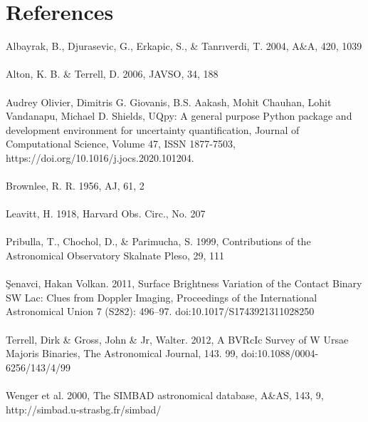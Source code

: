 \section{References}
\label{sec:ref}

Albayrak, B., Djurasevic, G., Erkapic, S., \& Tanrıverdi, T. 2004, A\&A, 420, 1039\\ \\
Alton, K. B. \& Terrell, D. 2006, JAVSO, 34, 188\\ \\ 
Audrey Olivier, Dimitris G. Giovanis, B.S. Aakash, Mohit Chauhan, Lohit Vandanapu, Michael D. Shields, UQpy: A general purpose Python package and development environment for uncertainty quantification, Journal of Computational Science, Volume 47, ISSN 1877-7503, https://doi.org/10.1016/j.jocs.2020.101204.\\ \\
Brownlee, R. R. 1956, AJ, 61, 2\\ \\
Leavitt, H. 1918, Harvard Obs. Circ., No. 207\\ \\
Pribulla, T., Chochol, D., \& Parimucha, S. 1999, Contributions of the Astronomical Observatory Skalnate Pleso, 29, 111\\ \\
Şenavci, Hakan Volkan. 2011, Surface Brightness Variation of the Contact Binary SW Lac: Clues from Doppler Imaging, Proceedings of the International Astronomical Union 7 (S282): 496–97. doi:10.1017/S1743921311028250 \\ \\
Terrell, Dirk \& Gross, John \& Jr, Walter. 2012, A BVRcIc Survey of W Ursae Majoris Binaries, The Astronomical Journal, 143. 99, doi:10.1088/0004-6256/143/4/99 \\ \\
Wenger et al. 2000, The SIMBAD astronomical database, A\&AS, 143, 9, http://simbad.u-strasbg.fr/simbad/\\ \\

